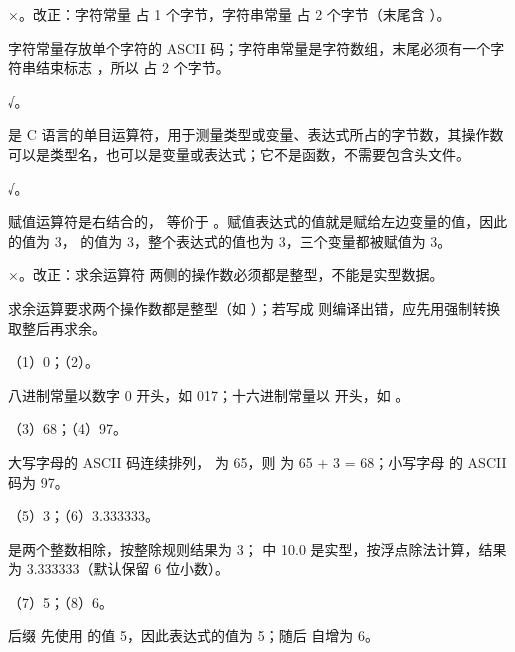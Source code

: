 \documentclass[a4paper,11pt]{article}
\begin{document}
\q ×。改正：字符常量  占 1 个字节，字符串常量  占 2 个字节（末尾含 ）。\begin{analysis}字符常量存放单个字符的 ASCII 码；字符串常量是字符数组，末尾必须有一个字符串结束标志 ，所以  占 2 个字节。\end{analysis}

\q √。\begin{analysis} 是 C 语言的单目运算符，用于测量类型或变量、表达式所占的字节数，其操作数可以是类型名，也可以是变量或表达式；它不是函数，不需要包含头文件。\end{analysis}

\q √。\begin{analysis}赋值运算符是右结合的， 等价于 。赋值表达式的值就是赋给左边变量的值，因此  的值为 3， 的值为 3，整个表达式的值也为 3，三个变量都被赋值为 3。\end{analysis}

\q ×。改正：求余运算符 \code{\%} 两侧的操作数必须都是整型，不能是实型数据。\begin{analysis}求余运算要求两个操作数都是整型（如 ）；若写成  则编译出错，应先用强制转换取整后再求余。\end{analysis}


\q （1）0；（2）。\begin{analysis}八进制常量以数字 0 开头，如 017；十六进制常量以  开头，如 。\end{analysis}

\q （3）68；（4）97。\begin{analysis}大写字母的 ASCII 码连续排列， 为 65，则  为 65 + 3 = 68；小写字母  的 ASCII 码为 97。\end{analysis}

\q （5）3；（6）3.333333。\begin{analysis} 是两个整数相除，按整除规则结果为 3； 中 10.0 是实型，按浮点除法计算，结果为 3.333333（默认保留 6 位小数）。\end{analysis}

\q （7）5；（8）6。\begin{analysis}后缀  先使用  的值 5，因此表达式的值为 5；随后  自增为 6。\end{analysis}
\end{document}
